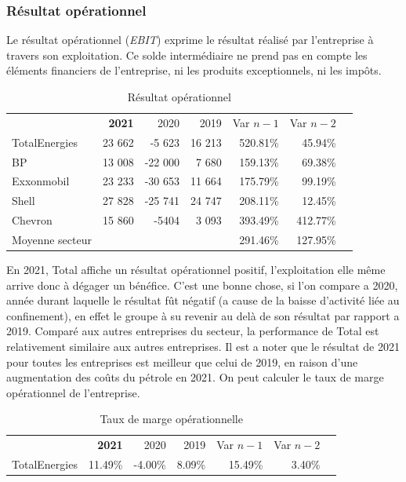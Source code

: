 \documentclass[12pt]{article}
\begin{document}
\subsubsection{Résultat opérationnel}
Le résultat opérationnel (\textit{EBIT}) exprime le résultat réalisé par l'entreprise à travers son exploitation. Ce 
solde intermédiaire ne prend pas en compte les éléments financiers de l'entreprise, ni les produits exceptionnels, ni les impôts. 
\begin{table}[H]
    \sffamily
    \centering
    \caption{Résultat opérationnel}
    \label{table:EBIT}
    \begin{tabular}{l*{1}{rrrrrr}}
    \toprule
        ~ & \textbf{2021} & 2020 & 2019 & Var $n-1$ & Var $n-2$ \\
    \cmidrule(r){1-1}\cmidrule(r){2-4}\cmidrule(r){5-6}
        TotalEnergies & 23 662	&-5 623	&16 213	&520.81\%	&45.94\% \\
    \cmidrule(r){1-1}\cmidrule(r){2-4}\cmidrule(r){5-6}
        BP & 13 008 & -22 000 & 7 680 & 159.13\% & 69.38\% \\ 
        Exxonmobil & 23 233 & -30 653 & 11 664 & 175.79\% & 99.19\% \\ 
        Shell & 27 828 & -25 741 & 24 747 & 208.11\% & 12.45\% \\ 
        Chevron & 15 860 & -5404 & 3 093 & 393.49\% & 412.77\% \\ 
    \cmidrule(r){1-1}\cmidrule(r){2-4}\cmidrule(r){5-6}
        Moyenne secteur & ~ & ~ & ~ & 291.46\% & 127.95\% \\ 
    \bottomrule
    \end{tabular}
\end{table}
En 2021, Total affiche un résultat opérationnel positif, l'exploitation elle même arrive donc à dégager un bénéfice.
C'est une bonne chose, si l'on compare a 2020, année durant laquelle le résultat fût négatif (a cause de la baisse 
d'activité liée au confinement), en effet le groupe à su revenir au delà de son résultat par rapport a 2019.
Comparé aux autres entreprises du secteur, la performance de Total est relativement similaire aux autres 
entreprises. Il est a noter que le résultat de 2021 pour toutes les entreprises est meilleur que celui de 2019, en 
raison d'une augmentation des coûts du pétrole en 2021. On peut calculer le taux de marge opérationnel de l'entreprise.
\begin{table}[H]
    \sffamily
    \centering
    \caption{Taux de marge opérationnelle}
    \label{table:marge_EBIT}
    \begin{tabular}{l*{1}{rrrrrr}}
    \toprule
        ~ & \textbf{2021} & 2020 & 2019 & Var $n-1$ & Var $n-2$ \\
    \cmidrule(r){1-1}\cmidrule(r){2-4}\cmidrule(r){5-6}
        TotalEnergies & 11.49\% 	& -4.00\%	& 8.09\%	&15.49\%	&3.40\% \\
    \bottomrule
    \end{tabular}
\end{table}
\end{document}
